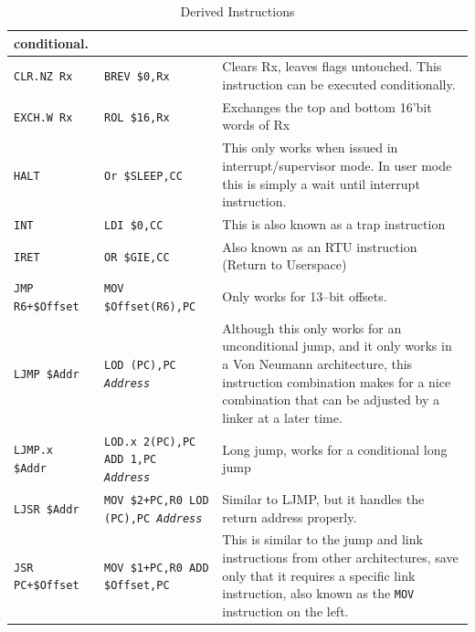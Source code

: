 \documentclass{gqtekspec}
\begin{document}
\begin{table}
\begin{center}
\begin{tabular}{p{1.4in}p{1.5in}p{3in}}
		conditional. \\\hline
{\tt CLR.NZ Rx }
	& {\tt BREV \$0,Rx}
	& Clears Rx, leaves flags untouched.  This instruction can be executed
		conditionally. \\\hline
{\tt EXCH.W Rx }
	& {\tt ROL \$16,Rx}
	& Exchanges the top and bottom 16'bit words of Rx \\\hline
{\tt HALT }
	& {\tt Or \$SLEEP,CC}
	& This only works when issued in interrupt/supervisor mode.  In user
	mode this is simply a wait until interrupt instruction. \\\hline
{\tt INT } & {\tt LDI \$0,CC} & This is also known as a trap instruction\\\hline
{\tt IRET}
	& {\tt OR \$GIE,CC}
	& Also known as an RTU instruction (Return to Userspace) \\\hline
{\tt JMP R6+\$Offset}
	& {\tt MOV \$Offset(R6),PC}
	& Only works for 13--bit offsets.\\\hline
{\tt LJMP \$Addr}
	& \parbox[t]{1.5in}{\tt LOD (PC),PC \\ {\em Address }}
	& Although this only works for an unconditional jump, and it only
	works in a Von Neumann architecture, this instruction combination makes
	for a nice combination that can be adjusted by a linker at a later
	time.\\\hline
{\tt LJMP.x \$Addr}
	& \parbox[t]{1.5in}{\tt LOD.x 2(PC),PC \\ ADD 1,PC \\ {\em Address }}
	& Long jump, works for a conditional long jump \\\hline
{\tt LJSR \$Addr  }
	& \parbox[t]{1.5in}{\tt MOV \$2+PC,R0 \\ LOD (PC),PC \\ {\em Address}}
	& Similar to LJMP, but it handles the return address properly.
	\\\hline
{\tt JSR PC+\$Offset  }
	& \parbox[t]{1.5in}{\tt MOV \$1+PC,R0 \\ ADD \$Offset,PC}
	& This is similar to the jump and link instructions from other
	architectures, save only that it requires a specific link
	instruction, also known as the {\tt MOV} instruction on the
	left.\\\hline
\end{tabular}
\caption{Derived Instructions}\label{tbl:derived-1}
\end{center}\end{table}
\end{document}
